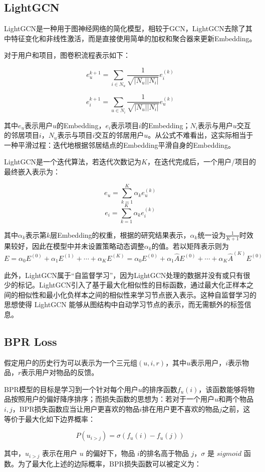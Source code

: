 \documentclass[hyperref,a4paper,UTF8]{ctexart}
\begin{document}
\subsection{LightGCN}
LightGCN是一种用于图神经网络的简化模型，相较于GCN，LightGCN去除了其中特征变化和非线性激活，而是直接使用简单的加权和聚合器来更新Embedding。

对于用户和项目，图卷积流程表示如下\cite{he2020lightgcn}：

$$e_u^{k+1}=\sum_{i\in N_u}\frac{1}{\sqrt{|N_u| |N_i|}}e_i^{(k)}$$

$$e_i^{k+1}=\sum_{u\in N_i}\frac{1}{\sqrt{|N_u| |N_i|}}e_u^{(k)}$$

其中$e_u$表示用户$u$的Embedding，$e_i$表示项目$i$的Embedding；$N_i$表示与用户$u$交互的邻居项目$i$，$N_u$表示与项目$i$交互的邻居用户$u$。从公式不难看出，这实际相当于一种平滑过程：迭代地根据邻居结点的Embedding平滑自身的Embedding。

LightGCN是一个迭代算法，若迭代次数记为$K$，在迭代完成后，一个用户/项目的最终嵌入表示为：

$$e_u=\sum^K_{k=1}\alpha_k e_u^{(k)}$$
$$e_i=\sum^K_{k=1}\alpha_k e_i^{(k)}$$

其中$\alpha_k$表示第$k$层Embedding的权重，根据\cite{he2020lightgcn}的研究结果表示，$\alpha_k$统一设为$\frac{1}{K+1}$时效果较好，因此在模型中并未设置策略动态调整$\alpha_k$的值。若以矩阵表示则为$E=\alpha_0E^{(0)}+\alpha_1E^{(1)}+\cdots +\alpha_K E^{(K)}=\alpha_0 E^{(0)}+\alpha_1\hat{A}E^{(0)}+\cdots +\alpha_K \hat{A}^{(K)} E^{(0)}$


此外，LightGCN属于“自监督学习”，因为LightGCN处理的数据并没有或只有很少的标记。LightGCN引入了基于最大化相似性的目标函数，通过最大化正样本之间的相似性和最小化负样本之间的相似性来学习节点嵌入表示。这种自监督学习的思想使得 LightGCN 能够从图结构中自动学习节点的表示，而无需额外的标签信息。
\subsection{BPR Loss}
假定用户的历史行为可以表示为一个三元组$(u,i,r)$，其中$u$表示用户，$i$表示物品，$r$表示用户对物品的反馈。

BPR模型的目标是学习到一个针对每个用户$u$的排序函数$f_u(i)$，该函数能够将物品按照用户的偏好降序排序；而损失函数的思想为：若对于一个用户$u$和两个物品$i,j$，BPR损失函数应当让用户更喜欢的物品$i$排在用户更不喜欢的物品$j$之前，这等价于最大化如下边界概率\cite{rendle2012bpr}：

$$P(u_{i>j}) = \sigma(f_u(i) - f_u(j))$$

其中，$u_{i>j}$ 表示在用户 $u$ 的偏好下，物品 $i$的排名高于物品 $j$，$\sigma$ 是 $sigmoid$ 函数。为了最大化上述的边际概率，BPR损失函数可以被定义为\cite{rendle2012bpr}：
\end{document}
